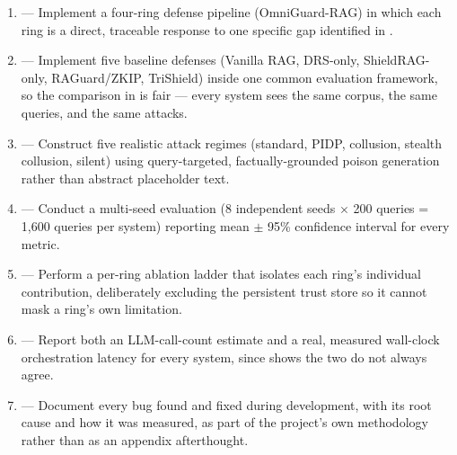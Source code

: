 \begin{enumerate}
\item[\textbf{O1}] --- Implement a four-ring defense pipeline
  (OmniGuard-RAG) in which each ring is a direct, traceable response to
  one specific gap identified in .
\item[\textbf{O2}] --- Implement five baseline defenses (Vanilla RAG,
  DRS-only, ShieldRAG-only, RAGuard/ZKIP, TriShield) inside one common
  evaluation framework, so the comparison in  is fair
  --- every system sees the same corpus, the same queries, and the same
  attacks.
\item[\textbf{O3}] --- Construct five realistic attack regimes (standard,
  PIDP, collusion, stealth collusion, silent) using query-targeted,
  factually-grounded poison generation rather than abstract placeholder
  text.
\item[\textbf{O4}] --- Conduct a multi-seed evaluation (8 independent
  seeds $\times$ 200 queries = 1,600 queries per system) reporting mean
  $\pm$ 95\% confidence interval for every metric.
\item[\textbf{O5}] --- Perform a per-ring ablation ladder that isolates
  each ring's individual contribution, deliberately excluding the
  persistent trust store so it cannot mask a ring's own limitation.
\item[\textbf{O6}] --- Report both an LLM-call-count estimate and a
  real, measured wall-clock orchestration latency for every system, since
   shows the two do not always agree.
\item[\textbf{O7}] --- Document every bug found and fixed during
  development, with its root cause and how it was measured, as part of
  the project's own methodology rather than as an appendix afterthought.
\end{enumerate}
